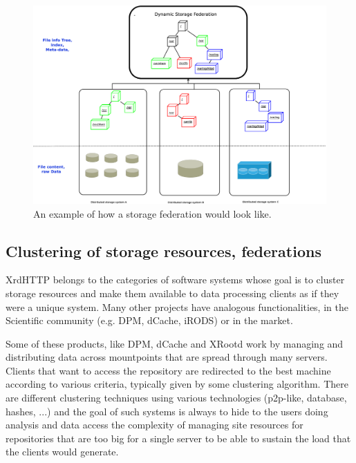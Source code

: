 \documentclass[12pt]{article} %
\begin{document}
\begin{figure}
  \begin{center}
    \includegraphics[width=28pc]{diagram-principle.eps}
  \end{center}
  \caption{\label{fig_mergenamespace}An example of how a storage federation would look like.}
\end{figure}

\subsection{Clustering of storage resources, federations}

XrdHTTP belongs to the categories of software systems whose goal is to cluster storage resources and make them available to data processing clients as if they were a unique system. Many other projects have analogous functionalities, in the Scientific community (e.g. DPM, dCache, iRODS) or in the market.

Some of these products, like  DPM, dCache and XRootd work by managing and distributing data across mountpoints that are spread through many servers. Clients that want to access the repository are redirected to the best machine according to various criteria, typically given by some clustering algorithm. There are different clustering techniques using various technologies (p2p-like, database, hashes, ...) and the goal of such systems is always to hide to the users doing analysis and data access the complexity of managing site resources
for repositories that are too big for a single server to be able to sustain the load that the clients would generate.\\
\end{document}
